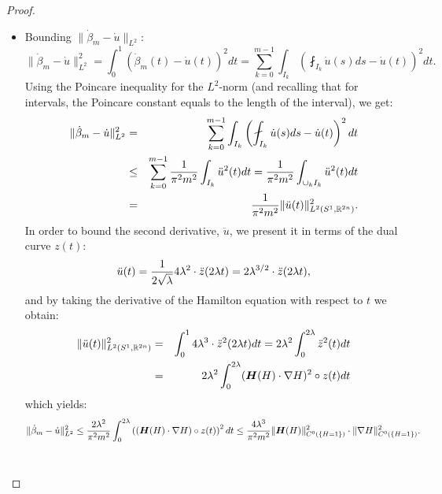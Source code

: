 \documentclass[../capacities_main.tex]{subfiles}
\begin{document}
\begin{proof}
\begin{itemize}
	 \item Bounding $\|\dot\beta_m-\dot u\|_{L^2}$:
		\[
		\|\dot\beta_m-\dot u\|_{L^2}^2 = \int_0^1 (\dot\beta_m(t)-\dot u(t))^2 dt = \sum_{k=0}^{m-1} \int_{I_k} \left( \fint_{I_k}\dot u(s) ds-\dot u(t)\right)^2 dt.
		\]
		Using the Poincare inequality for the $L^2$-norm (and recalling that for intervals, the Poincare constant equals to the length of the interval), we get:
		\begin{eqnarray*}
		 	\|\dot\beta_m-\dot u\|_{L^2}^2 &=& \sum_{k=0}^{m-1} \int_{I_k} \left( \fint_{I_k}\dot u(s) ds-\dot u(t)\right)^2 dt\\
		 	&\leq& \sum_{k=0}^{m-1} \frac{1}{\pi^2 m^2}\int_{I_k} \ddot u^2(t)dt =  \frac{1}{\pi^2 m^2} \int_{\cup_k I_k} \ddot u^2(t)dt\\
		 	&=& \frac{1}{\pi^2 m^2} \|\ddot u(t)\|_{L^2(S^1,\R^{2n})}^2.
		\end{eqnarray*}
		In order to bound the second derivative, $\ddot u$, we present it in terms of the dual curve $z(t)$: 
		\[
		\ddot u(t) = \frac{1}{2\sqrt{\lambda}}4\lambda^2\cdot\ddot z(2\lambda t) = 2\lambda^{3/2}\cdot\ddot z(2\lambda t) ,
		\]
		and by taking the derivative of the Hamilton equation with respect to  $t$ we obtain:
		\begin{eqnarray*}
			\|\ddot u(t)\|_{L^2(S^1,{\mathbb R}^{2n})}^2 &=& \int_0^1  4\lambda^3\cdot\ddot z^2(2\lambda t) dt = 2\lambda^2 \int_0^{2\lambda}\ddot z^2(t) dt\\
			&=& 2\lambda^2 \int_0^{2\lambda} (\boldsymbol{H}(H)\cdot \nabla H)^2\circ z(t) dt
		\end{eqnarray*}
		which yields:
		\[
		\|\dot\beta_m-\dot u\|_{L^2}^2 \leq \frac{2\lambda^2}{\pi^2 m^2} \int_0^{2\lambda} \left( (\boldsymbol{H}(H)\cdot \nabla H)\circ z(t)\right)^2 dt\leq \frac{4\lambda^3}{\pi^2 m^2}\|\boldsymbol{H} (H)\|^2_{C^0(\{H=1\})}\cdot \|\nabla H\|^2_{C^0(\{H=1\})}.
		\]	\\
	 

\end{itemize}
\end{proof}
\end{document}
